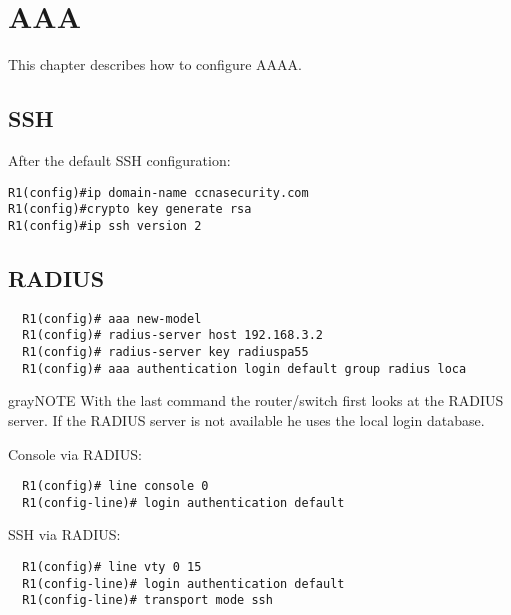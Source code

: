 \section{AAA}
This chapter describes how to configure AAAA.

\subsection{SSH}
After the default SSH configuration:
\begin{verbatim}
R1(config)#ip domain-name ccnasecurity.com
R1(config)#crypto key generate rsa
R1(config)#ip ssh version 2
\end{verbatim}

\subsection{RADIUS}
\begin{verbatim}
  R1(config)# aaa new-model
  R1(config)# radius-server host 192.168.3.2
  R1(config)# radius-server key radiuspa55
  R1(config)# aaa authentication login default group radius loca
\end{verbatim}
\begin{textbox}{gray}{NOTE}
  With the last command the router/switch first looks at the RADIUS server.
  If the RADIUS server is not available he uses the local login database.
\end{textbox}
Console via RADIUS:
\begin{verbatim}
  R1(config)# line console 0
  R1(config-line)# login authentication default
\end{verbatim}

SSH via RADIUS:
\begin{verbatim}
  R1(config)# line vty 0 15
  R1(config-line)# login authentication default
  R1(config-line)# transport mode ssh
\end{verbatim}
